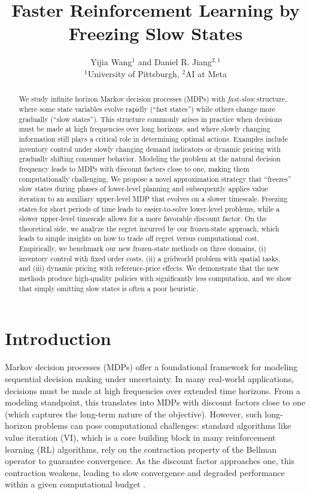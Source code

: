\documentclass[11pt, notitlepage]{article}
\title{\huge {Faster Reinforcement Learning by Freezing Slow States}}
\author{{\Large Yijia Wang$^1$ and Daniel R. Jiang$^{2,1}$\\
$^1$University of Pittsburgh, $^2$AI at Meta}}
\date{}
\newcommand{\1}{\mathbbm{1}}
\begin{document}
\maketitle

\begin{abstract}
    We study infinite horizon Markov decision processes (MDPs) with \emph{fast-slow} structure, where some state variables evolve rapidly (``fast states'') while others change more gradually (``slow states''). This structure commonly arises in practice when decisions must be made at high frequencies over long horizons, and where slowly changing information still plays a critical role in determining optimal actions. Examples include inventory control under slowly changing demand indicators or dynamic pricing with gradually shifting consumer behavior. Modeling the problem at the natural decision frequency leads to MDPs with discount factors close to one, making them computationally challenging. We propose a novel approximation strategy that ``freezes'' slow states during phases of lower-level planning and subsequently applies value iteration to an auxiliary upper-level MDP that evolves on a slower timescale. Freezing states for short periods of time leads to easier-to-solve lower-level problems, while a slower upper-level timescale allows for a more favorable discount factor. On the theoretical side, we analyze the regret incurred by our frozen-state approach, which leads to simple insights on how to trade off regret versus computational cost. Empirically, we benchmark our new frozen-state methods on three domains, (i) inventory control with fixed order costs, (ii) a gridworld problem with spatial tasks, and (iii) dynamic pricing with reference-price effects. We demonstrate that the new methods produce high-quality policies with significantly less computation, and we show that simply omitting slow states is often a poor heuristic.

\end{abstract}



\section{Introduction}

Markov decision processes (MDPs) offer a foundational framework for modeling sequential decision making under uncertainty. In many real-world applications, decisions must be made at high frequencies over extended time horizons. From a modeling standpoint, this translates into MDPs with discount factors close to one (which captures the long-term nature of the objective). However, such long-horizon problems can pose computational challenges: standard algorithms like value iteration (VI), which is a core building block in many reinforcement learning (RL) algorithms, rely on the contraction property of the Bellman operator to guarantee convergence. As the discount factor approaches one, this contraction weakens, leading to slow convergence and degraded performance within a given computational budget \citep{bertsekas1996neuro, jiang2015dependence}.
\end{document}
